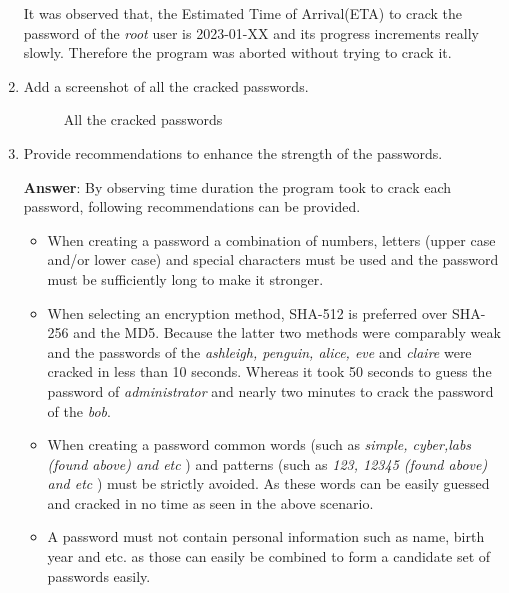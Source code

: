 \documentclass[11pt,letterpaper]{article}
\begin{document}
\begin{enumerate}
		It was observed that, the Estimated Time of Arrival(ETA) to crack the password of the \textit{root} user is 2023-01-XX and its progress increments really slowly. Therefore the program was aborted without trying to crack it.
		
		
		\item Add a screenshot of all the cracked passwords.
		
		
		\begin{figure}[H]
			\centering
			\caption{All the cracked passwords}
		\end{figure}
		\pagebreak
		\item Provide recommendations to enhance the strength of the passwords.
		
		\textbf{\Large Answer}: By observing time duration the program took to crack each password, following recommendations can be provided.
		
		\begin{itemize}
			\item When creating a password a combination of numbers, letters (upper case and/or lower case)  and special characters must be used and the password must be sufficiently long to make it stronger.
			
			\item When selecting an encryption method, SHA-512 is preferred over SHA-256 and the MD5. Because the latter two methods were comparably weak and the passwords of the \textit{ashleigh, penguin, alice, eve} and \textit{claire} were cracked in less than 10 seconds. Whereas it took 50 seconds to guess the password of \textit{administrator} and nearly two minutes to crack the password of the \textit{bob}.
			
			\item When creating a password common words (such as \textit{simple, cyber,labs (found above)  and etc} ) and patterns (such as \textit{123, 12345 (found above) and etc} ) must be strictly avoided. As these words can be easily guessed and cracked in no time as seen in the above scenario.					
			
			\item A password must not contain personal information such as name, birth year and etc. as those can easily be combined to form a candidate set of passwords easily.
		\end{itemize}
		
		
		
		\clearpage
		
	\end{enumerate}    
	
\end{document}
